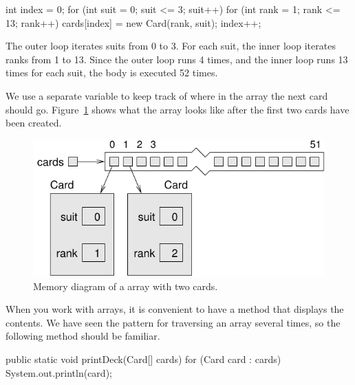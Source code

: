 \begin{code}
int index = 0;
for (int suit = 0; suit <= 3; suit++) {
    for (int rank = 1; rank <= 13; rank++) {
        cards[index] = new Card(rank, suit);
        index++;
    }
}
\end{code}

The outer loop iterates suits from 0 to 3.
For each suit, the inner loop iterates ranks from 1 to 13.
Since the outer loop runs 4 times, and the inner loop runs 13 times for each suit, the body is executed 52 times.


We use a separate variable  to keep track of where in the array the next card should go.
Figure~\ref{fig.cardarray2} shows what the array looks like after the first two cards have been created.

\begin{figure}[!ht]
\begin{center}
\includegraphics{figs/cardarray2.pdf}
\caption{Memory diagram of a  array with two cards.}
\label{fig.cardarray2}
\end{center}
\end{figure}


When you work with arrays, it is convenient to have a method that displays the contents.
We have seen the pattern for traversing an array several times, so the following method should be familiar.


\begin{code}
public static void printDeck(Card[] cards) {
    for (Card card : cards) {
        System.out.println(card);
    }
}
\end{code}


